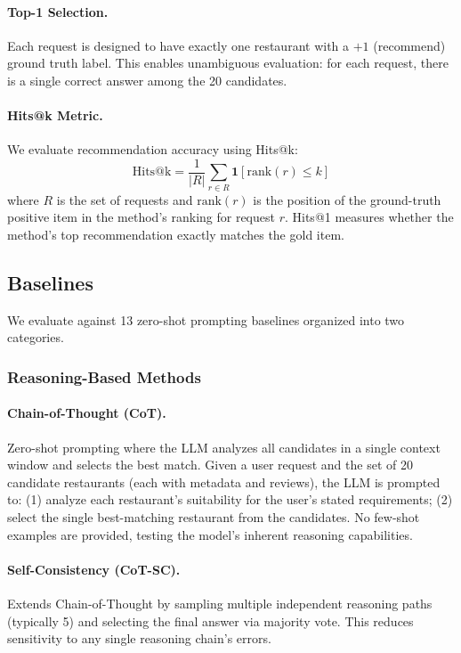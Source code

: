 \paragraph{Top-1 Selection.}
Each request is designed to have exactly one restaurant with a $+1$ (recommend) ground truth label.
This enables unambiguous evaluation: for each request, there is a single correct answer among the 20 candidates.

\paragraph{Hits@k Metric.}
We evaluate recommendation accuracy using Hits@k:
\begin{equation}
    \text{Hits@k} = \frac{1}{|R|} \sum_{r \in R} \mathbf{1}[\text{rank}(r) \leq k]
\end{equation}
where $R$ is the set of requests and $\text{rank}(r)$ is the position of the ground-truth positive item in the method's ranking for request $r$.
Hits@1 measures whether the method's top recommendation exactly matches the gold item.

\subsection{Baselines}
\label{app:baselines}

We evaluate against 13 zero-shot prompting baselines organized into two categories.

\subsubsection{Reasoning-Based Methods}

\paragraph{Chain-of-Thought (CoT).}
Zero-shot prompting where the LLM analyzes all candidates in a single context window and selects the best match.
Given a user request and the set of 20 candidate restaurants (each with metadata and reviews), the LLM is prompted to:
(1) analyze each restaurant's suitability for the user's stated requirements;
(2) select the single best-matching restaurant from the candidates.
No few-shot examples are provided, testing the model's inherent reasoning capabilities.

\paragraph{Self-Consistency (CoT-SC).}
Extends Chain-of-Thought by sampling multiple independent reasoning paths (typically 5) and selecting the final answer via majority vote.
This reduces sensitivity to any single reasoning chain's errors.

